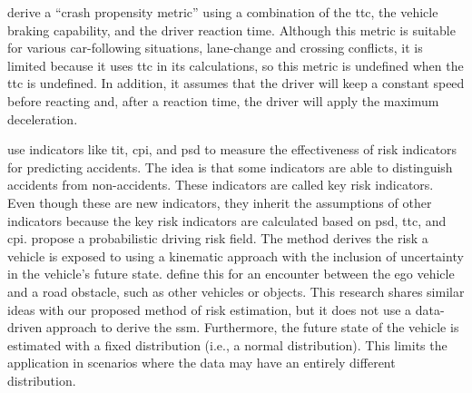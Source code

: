 \textcite{wang2014evaluation} derive a ``crash propensity metric'' using a combination of the \ac{ttc}, the vehicle braking capability, and the driver reaction time. 
Although this metric is suitable for various car-following situations, lane-change and crossing conflicts, it is limited because it uses \ac{ttc} in its calculations, so this metric is undefined when the \ac{ttc} is undefined. 
In addition, it assumes that the driver will keep a constant speed before reacting and, after a reaction time, the driver will apply the maximum deceleration. \cendb


\textcite{shi2018key} use indicators like \ac{tit}, \ac{cpi}, and \ac{psd} to measure the effectiveness of risk indicators for predicting accidents. 
The idea is that some indicators are able to distinguish accidents from non-accidents. 
These indicators are called key risk indicators. 
\cstartb Even though these are new indicators, they inherit the assumptions of other indicators because the key risk indicators are calculated based on \ac{psd}, \ac{ttc}, and \ac{cpi}. \cendb
\textcite{mullakkal2020probabilistic} propose a probabilistic driving risk field.
The method derives the risk a vehicle is exposed to using a kinematic approach with the inclusion of uncertainty in the vehicle's future state. 
\textcite{mullakkal2020probabilistic} define this for an encounter between the ego vehicle and a road obstacle, such as other vehicles or objects. 
\cstartb This research shares similar ideas with our proposed method of risk estimation, but it does not use a data-driven approach to derive the \ac{ssm}. 
Furthermore, the future state of the vehicle is estimated with a fixed distribution (i.e., a normal distribution). 
This limits the application in scenarios where the data may have an entirely different distribution. \cendb


